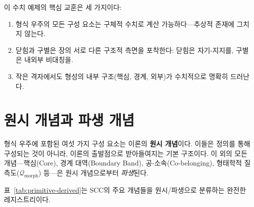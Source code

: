 이 수치 예제의 핵심 교훈은 세 가지이다:
\begin{enumerate}
    \item 형식 우주의 모든 구성 요소는 구체적 수치로 계산 가능하다---추상적 존재에 그치지 않는다.
    \item 닫힘과 구별은 장의 서로 다른 구조적 측면을 포착한다: 닫힘은 자기-지지를, 구별은 내외부 비대칭을.
    \item 작은 격자에서도 형성의 내부 구조(핵심, 경계, 외부)가 수치적으로 명확히 드러난다.
\end{enumerate}


\section{원시 개념과 파생 개념}
\label{sec:primitive-vs-derived}

형식 우주에 포함된 여섯 가지 구성 요소는 이론의 \textbf{원시 개념}이다. 이들은 정의를 통해 구성되는 것이 아니라, 이론의 출발점으로 받아들여지는 기본 구조이다. 이 외의 모든 개념---핵심(Core), 경계 대역(Boundary Band), 공-소속(Co-belonging), 형태학적 질 측도($\mathcal{Q}_{\mathrm{morph}}$) 등---은 원시 개념으로부터 \emph{파생}된다.

표~\ref{tab:primitive-derived}는 SCC의 주요 개념들을 원시/파생으로 분류하는 완전한 레지스트리이다.

